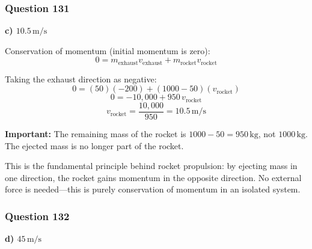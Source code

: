 \documentclass[12pt,letterpaper]{article}
\begin{document}
\subsubsection*{Question 131}

\begin{answerbox}
\textbf{c) $10.5\,\text{m/s}$}
\end{answerbox}

\begin{explanationbox}
Conservation of momentum (initial momentum is zero):
\[
0 = m_{\text{exhaust}} v_{\text{exhaust}} + m_{\text{rocket}} v_{\text{rocket}}
\]

Taking the exhaust direction as negative:
\[
0 = (50)(-200) + (1000 - 50)(v_{\text{rocket}})
\]
\[
0 = -10{,}000 + 950\,v_{\text{rocket}}
\]
\[
v_{\text{rocket}} = \frac{10{,}000}{950} = 10.5\,\text{m/s}
\]

\textbf{Important:} The remaining mass of the rocket is $1000 - 50 = 950\,\text{kg}$, not $1000\,\text{kg}$. The ejected mass is no longer part of the rocket.

This is the fundamental principle behind rocket propulsion: by ejecting mass in one direction, the rocket gains momentum in the opposite direction. No external force is needed---this is purely conservation of momentum in an isolated system.
\end{explanationbox}

\subsubsection*{Question 132}

\begin{answerbox}
\textbf{d) $45\,\text{m/s}$}
\end{answerbox}
\end{document}
